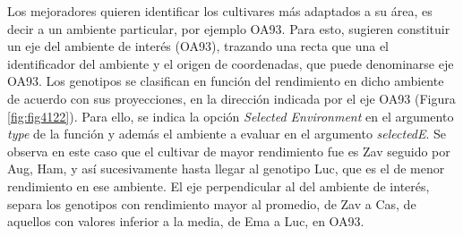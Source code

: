 
Los mejoradores quieren identificar los cultivares más adaptados a su área, es decir a un ambiente particular, por ejemplo OA93. Para esto, \citet{YanHunt2002} sugieren constituir un eje del ambiente de interés (OA93), trazando una recta que una el identificador del ambiente y el origen de coordenadas, que puede denominarse eje OA93. Los genotipos se  clasifican en función del rendimiento en dicho ambiente de acuerdo con sus proyecciones, en la dirección indicada por el eje OA93 (Figura \ref{fig:fig4122}). Para ello, se indica la opción \emph{Selected Environment} en el argumento \emph{type} de la función y además el ambiente a evaluar en el argumento  \emph{selectedE}. Se observa en este caso que el cultivar de mayor rendimiento fue es Zav seguido por Aug, Ham, y así sucesivamente hasta llegar al genotipo Luc, que es el de menor rendimiento en ese ambiente. El eje perpendicular al del ambiente de interés, separa los genotipos con rendimiento mayor al promedio, de Zav a Cas, de aquellos con valores inferior a la media, de Ema a Luc, en OA93.
 
